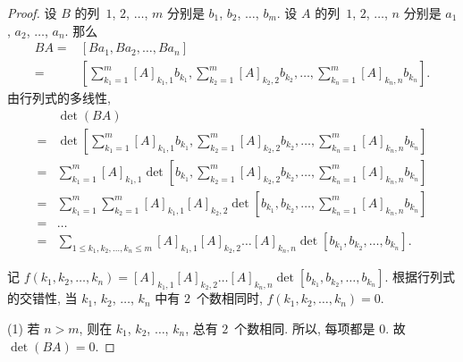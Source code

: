 \documentclass[../libro.tex]{subfiles}
\begin{document}
\begin{proof}
    设 \(B\) 的列~\(1\), \(2\), \(\dots\), \(m\)
    分别是
    \(b_1\), \(b_2\), \(\dots\), \(b_m\).
    设 \(A\) 的列~\(1\), \(2\), \(\dots\), \(n\)
    分别是
    \(a_1\), \(a_2\), \(\dots\), \(a_n\).
    那么
    \begin{align*}
        BA
        = {} & [Ba_1, Ba_2, \dots, Ba_n] \\
        = {} &
        \left[
            \sum_{k_1 = 1}^{m} {[A]_{k_1,1} b_{k_1}},
            \sum_{k_2 = 1}^{m} {[A]_{k_2,2} b_{k_2}},
            \dots,
            \sum_{k_n = 1}^{m} {[A]_{k_n,n} b_{k_n}}
        \right].
    \end{align*}
    由行列式的多线性,
    \begin{align*}
        & \det {(BA)}
        \\
        = {} &
        \det {\left[
                \sum_{k_1 = 1}^{m} {[A]_{k_1,1} b_{k_1}},
                \sum_{k_2 = 1}^{m} {[A]_{k_2,2} b_{k_2}},
                \dots,
                \sum_{k_n = 1}^{m} {[A]_{k_n,n} b_{k_n}}
        \right]}
        \\
        = {} &
        \sum_{k_1 = 1}^{m} {[A]_{k_1,1}
            \det {\left[
                    b_{k_1},
                    \sum_{k_2 = 1}^{m} {[A]_{k_2,2} b_{k_2}},
                    \dots,
                    \sum_{k_n = 1}^{m} {[A]_{k_n,n} b_{k_n}}
        \right]}}
        \\
        = {} &
        \sum_{k_1 = 1}^{m} {
            \sum_{k_2 = 1}^{m} {
                [A]_{k_1,1} [A]_{k_2,2}
                \det {\left[
                        b_{k_1},
                        b_{k_2},
                        \dots,
                        \sum_{k_n = 1}^{m} {[A]_{k_n,n} b_{k_n}}
        \right]}}}
        \\
        = {} &
        \dots
        \\
        = {} &
        \sum_{1 \leq k_1, k_2, \dots, k_n \leq m}
        {[A]_{k_1,1} [A]_{k_2,2} \dots [A]_{k_n,n}
        \det {[b_{k_1}, b_{k_2}, \dots, b_{k_n}]}}.
    \end{align*}

    记
    \(
        f(k_1, k_2, \dots, k_n)
        = [A]_{k_1,1} [A]_{k_2,2} \dots [A]_{k_n,n}
        \det {[b_{k_1}, b_{k_2}, \dots, b_{k_n}]}.
    \)
    根据行列式的交错性,
    当 \(k_1\), \(k_2\), \(\dots\), \(k_n\) 中有 \(2\)~个数相同时,
    \(f(k_1, k_2, \dots, k_n) = 0\).

    (1)
    若 \(n > m\),
    则在 \(k_1\), \(k_2\), \(\dots\), \(k_n\),
    总有 \(2\)~个数相同.
    所以, 每项都是 \(0\).
    故 \(\det {(BA)} = 0\).


\end{proof}
\end{document}
